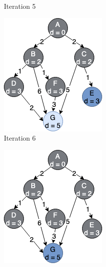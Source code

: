 \begin{figure}[h!]
\begin{subfigure}[b]{0.2\linewidth}
     \caption{Iteration 5}
  \end{subfigure}
  \hfill
  \begin{subfigure}[b]{0.2\linewidth}
    \includegraphics[width=\linewidth]{images/dijkstra_expansion6.png}
    \caption{Iteration 6}
  \end{subfigure}
  \hfill
  \begin{subfigure}[b]{0.2\linewidth}
    \includegraphics[width=\linewidth]{images/dijkstra_expansion7.png}

\end{subfigure}
\end{figure}
